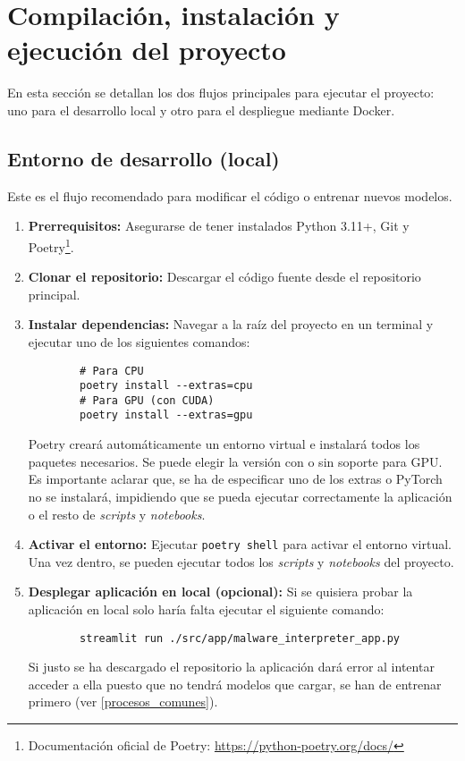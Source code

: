 \section{Compilación, instalación y ejecución del proyecto}
En esta sección se detallan los dos flujos principales para ejecutar el proyecto: uno para el desarrollo local y otro para el despliegue mediante Docker.

\subsection{Entorno de desarrollo (local)} \label{entorno_desarrollo}
Este es el flujo recomendado para modificar el código o entrenar nuevos modelos.
\begin{enumerate}
	\item \textbf{Prerrequisitos:} Asegurarse de tener instalados Python 3.11+, Git y Poetry\footnote{Documentación oficial de Poetry: \url{https://python-poetry.org/docs/}}.
	
	\item \textbf{Clonar el repositorio:} Descargar el código fuente desde el repositorio principal.
	
	\item \textbf{Instalar dependencias:} Navegar a la raíz del proyecto en un terminal y ejecutar uno de los siguientes comandos:
	
	\vspace*{-1em}
	\begin{verbatim}
		# Para CPU
		poetry install --extras=cpu
		# Para GPU (con CUDA)
		poetry install --extras=gpu
	\end{verbatim}
	\vspace*{-1em}
	
	Poetry creará automáticamente un entorno virtual e instalará todos los paquetes necesarios. Se puede elegir la versión con o sin soporte para GPU. Es importante aclarar que, se ha de especificar uno de los extras o PyTorch no se instalará, impidiendo que se pueda ejecutar correctamente la aplicación o el resto de \textit{scripts} y \textit{notebooks}.

	\item \textbf{Activar el entorno:} Ejecutar \texttt{poetry shell} para activar el entorno virtual. Una vez dentro, se pueden ejecutar todos los \textit{scripts} y \textit{notebooks} del proyecto.
	
	\item\textbf{ Desplegar aplicación en local (opcional):} Si se quisiera probar la aplicación en local solo haría falta ejecutar el siguiente comando:
	
	\begin{verbatim}
		streamlit run ./src/app/malware_interpreter_app.py
	\end{verbatim}
	
	\vspace{-1em}
	Si justo se ha descargado el repositorio la aplicación dará error al intentar acceder a ella puesto que no tendrá modelos que cargar, se han de entrenar primero (ver \ref{procesos_comunes}).
\end{enumerate}

